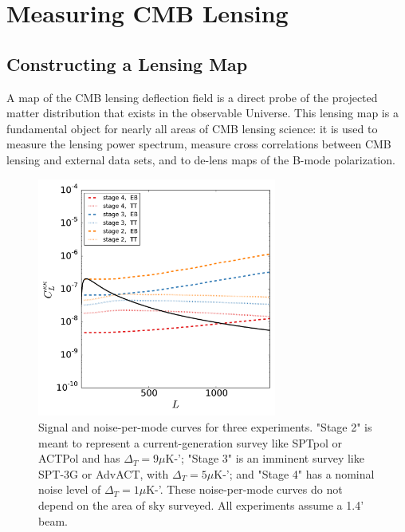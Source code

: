 \section{Measuring CMB Lensing}

\subsection{Constructing a Lensing Map}\label{kappaMap}

A map of the CMB lensing deflection field is a direct probe of the projected matter distribution that exists in the observable Universe. This lensing map is a fundamental object for nearly all areas of CMB lensing science: it is used to measure the lensing power spectrum, measure cross correlations between CMB lensing and external data sets, and to de-lens maps of the B-mode polarization.  

\begin{figure}[h]
\centering
\includegraphics[width=0.7\textwidth]{CMBLensing/n0s_s4.pdf}
\caption{Signal and noise-per-mode curves for three experiments. "Stage 2" is meant to represent a current-generation survey like SPTpol or ACTPol and has $\Delta_T = 9 \mu$K-';  "Stage 3" is an imminent survey like SPT-3G or AdvACT, with $\Delta_T = 5 \mu$K-'; and "Stage 4" has a nominal noise level of  $\Delta_T = 1 \mu$K-'.   These noise-per-mode curves do not depend on the area of sky surveyed.  All experiments assume a 1.4' beam.   }
\label{n0s_s4}
\end{figure}



